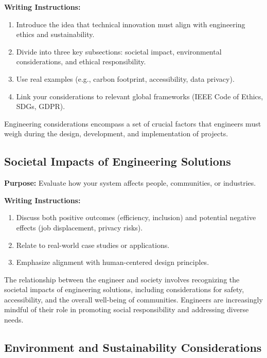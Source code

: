 {\color{red}\textbf{Writing Instructions:}
\begin{enumerate}
    \item Introduce the idea that technical innovation must align with engineering ethics and sustainability.
    
    \item Divide into three key subsections: societal impact, environmental considerations, and ethical responsibility.
    
    \item Use real examples (e.g., carbon footprint, accessibility, data privacy).
    
    \item Link your considerations to relevant global frameworks (IEEE Code of Ethics, SDGs, GDPR).
\end{enumerate}

Engineering considerations encompass a set of crucial factors that engineers must weigh during the design, development, and implementation of projects.}

\subsection{Societal Impacts of Engineering Solutions}

{\color{blue}\textbf{Purpose:}
Evaluate how your system affects people, communities, or industries.} \\

{\color{red}\textbf{Writing Instructions:}
\begin{enumerate}
    \item Discuss both positive outcomes (efficiency, inclusion) and potential negative effects (job displacement, privacy risks).
    
    \item Relate to real-world case studies or applications.
    
    \item Emphasize alignment with human-centered design principles.
\end{enumerate}

The relationship between the engineer and society involves recognizing the societal impacts of engineering solutions, including considerations for safety, accessibility, and the overall well-being of communities. Engineers are increasingly mindful of their role in promoting social responsibility and addressing diverse needs.}

\subsection{Environment and Sustainability Considerations}

